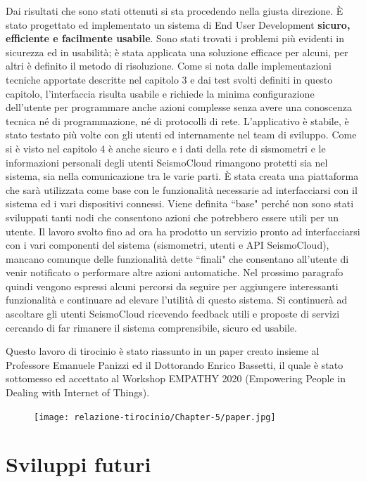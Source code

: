 \documentclass[a4paper,10pt]{memoir}
\begin{document}
Dai risultati che sono stati ottenuti si sta procedendo nella giusta direzione.
È stato progettato ed implementato un sistema di End User Development \textbf{sicuro, efficiente e facilmente usabile}.
Sono stati trovati i problemi più evidenti in sicurezza ed in usabilità; è stata applicata una soluzione efficace per alcuni, per altri è definito il metodo di risoluzione.
Come si nota dalle implementazioni tecniche apportate descritte nel capitolo 3 e dai test svolti definiti in questo capitolo, l'interfaccia risulta usabile e richiede la minima configurazione dell'utente per programmare anche azioni complesse senza avere una conoscenza tecnica né di programmazione, né di protocolli di rete.
L'applicativo è stabile, è stato testato più volte con gli utenti ed internamente nel team di sviluppo.
Come si è visto nel capitolo 4 è anche sicuro e i dati della rete di sismometri e le informazioni personali degli utenti SeismoCloud rimangono protetti sia nel sistema, sia nella comunicazione tra le varie parti.
È stata creata una piattaforma che sarà utilizzata come base con le funzionalità necessarie ad interfacciarsi con il sistema ed i vari dispositivi connessi.
Viene definita ``base" perché non sono stati sviluppati tanti nodi che consentono azioni che potrebbero essere utili per un utente.
Il lavoro svolto fino ad ora ha prodotto un servizio pronto ad interfacciarsi con i vari componenti del sistema (sismometri, utenti e API SeismoCloud), mancano comunque delle funzionalità dette ``finali" che consentano all'utente di venir notificato o performare altre azioni automatiche.
Nel prossimo paragrafo quindi vengono espressi alcuni percorsi da seguire per aggiungere interessanti funzionalità e continuare ad elevare l'utilità di questo sistema.
Si continuerà ad ascoltare gli utenti SeismoCloud ricevendo feedback utili e proposte di servizi cercando di far rimanere il sistema comprensibile, sicuro ed usabile.

\clearpage

Questo lavoro di tirocinio è stato riassunto in un paper creato insieme al Professore Emanuele Panizzi ed il Dottorando Enrico Bassetti, il quale è stato sottomesso ed accettato al Workshop EMPATHY 2020 (Empowering People in Dealing with Internet of Things).
\begin{figure}[hbt]
    \centering
    \texttt{[image: relazione-tirocinio/Chapter-5/paper.jpg]}
    \label{fig:paper}
\end{figure}

\section{Sviluppi futuri}
\end{document}
